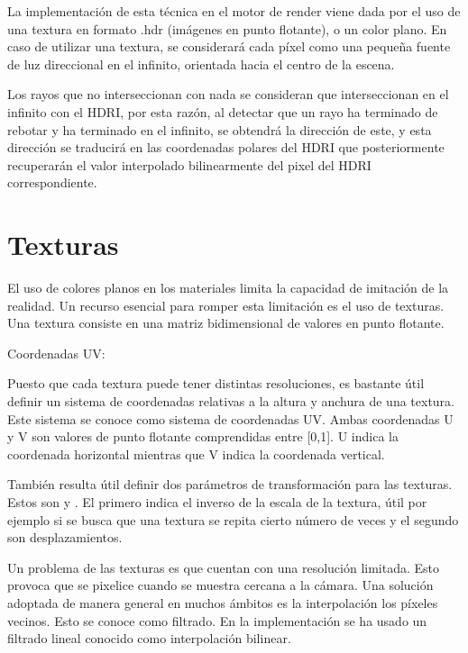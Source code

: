 \begin{itemize}
	La implementación de esta técnica en el motor de render viene dada por el uso de una textura en formato .hdr (imágenes en punto flotante), o un color plano. En caso de utilizar una textura, se considerará cada píxel como una pequeña fuente de luz direccional en el infinito, orientada hacia el centro de la escena. 

	Los rayos que no interseccionan con nada se consideran que interseccionan en el infinito con el HDRI, por esta razón, al detectar que un rayo ha terminado de rebotar y ha terminado en el infinito, se obtendrá la dirección de este, y esta dirección se traducirá en las coordenadas polares del HDRI que posteriormente recuperarán el valor interpolado bilinearmente del pixel del HDRI correspondiente.

	\end{itemize}

	\section{Texturas}
	
	El uso de colores planos en los materiales limita la capacidad de imitación de la realidad. Un recurso esencial para romper esta limitación es el uso de texturas. Una textura consiste en una matriz bidimensional de valores en punto flotante.

	
	
	Coordenadas UV:

	Puesto que cada textura puede tener distintas resoluciones, es bastante útil definir un sistema de coordenadas relativas a la altura y anchura de una textura. Este sistema se conoce como sistema de coordenadas UV. Ambas coordenadas U y V son valores de punto flotante comprendidas entre [0,1]. U indica la coordenada horizontal mientras que V indica la coordenada vertical.

	También resulta útil definir dos parámetros de transformación para las texturas. Estos son  y . El primero indica el inverso de la escala de la textura, útil por ejemplo si se busca que una textura se repita cierto número de veces y el segundo son desplazamientos.

	Un problema de las texturas es que cuentan con una resolución limitada. Esto provoca que se pixelice cuando se muestra cercana a la cámara. Una solución adoptada de manera general en muchos ámbitos es la interpolación los píxeles vecinos. Esto se conoce como filtrado. En la implementación se ha usado un filtrado lineal conocido como interpolación bilinear.


